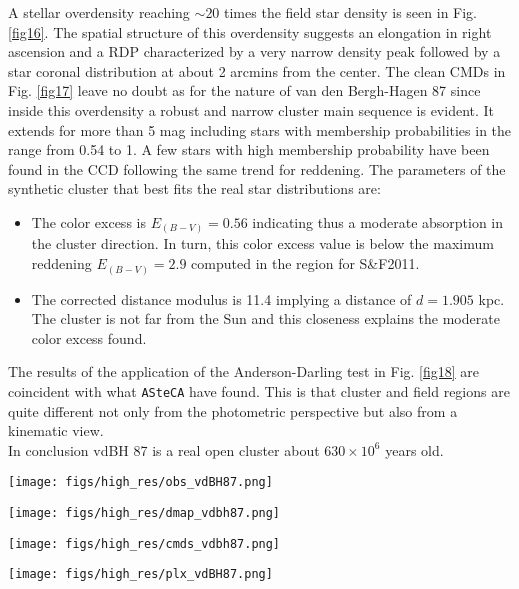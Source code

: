 \documentclass{aa}
\begin{document}
A stellar overdensity reaching $\sim20$ times the field star density is
seen in Fig. \ref{fig16}. The spatial structure of this overdensity suggests an
elongation in right ascension and a RDP characterized by a very narrow density
peak followed by a star coronal distribution at about 2 arcmins from the center.
The clean CMDs in Fig. \ref{fig17} leave no doubt as for the nature of van den
Bergh-Hagen 87 since inside this overdensity a robust and narrow cluster main
sequence is evident. It extends for more than 5 mag including stars with
membership probabilities in the range from 0.54 to 1. A few stars with high
membership probability have been found in the CCD following the same trend for
reddening. The parameters of the synthetic cluster that best fits the real star
distributions are:

\begin{itemize}
\item [a)] The color excess is $E_{(B-V)} = 0.56$ indicating thus a moderate
    absorption in the cluster direction. In turn, this color excess value is
    below the maximum reddening $E_{(B-V)} = 2.9$ computed in the region for 
    S\&F2011.
\item [b)] The corrected distance modulus is 11.4 implying a distance of $d =
    1.905$ kpc. The cluster is not far from the Sun and this closeness explains
    the moderate color excess found.
\end{itemize}

The results of the application of the Anderson-Darling test in Fig. \ref{fig18}
are coincident with what \texttt{ASteCA} have found. This is that cluster and
field regions are quite different not only from the photometric perspective but
also from a kinematic view.\\

In conclusion vdBH 87 is a real open cluster about
$630\times10^6$ years old.

\begin{figure*}[ht]
    \centering
    \texttt{[image: figs/high\_res/obs\_vdBH87.png]}
    \caption{Idem Fig. \ref{fig3} for vdBH 87.}
    \label{fig15}
\end{figure*}

\begin{figure*}[ht]
    \centering
    \texttt{[image: figs/high\_res/dmap\_vdbh87.png]}
    \caption{Idem Fig. \ref{fig4} for vdBH 87.}
    \label{fig16}
\end{figure*}

\begin{figure*}[ht]
    \centering
    \texttt{[image: figs/high\_res/cmds\_vdbh87.png]}
    \caption{Idem Fig. \ref{fig5} for vdBH 87.}
    \label{fig17}
\end{figure*}
\begin{figure*}[ht]
    \centering
    \texttt{[image: figs/high\_res/plx\_vdBH87.png]}
    \caption{Idem Fig. \ref{fig6} for vdBH 87.}
    \label{fig18}
\end{figure*}
\end{document}

